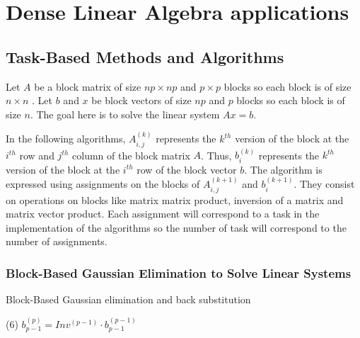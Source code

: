 \chapter{Dense Linear Algebra applications}
\graphicspath{{chapters/exp_dense/}}

\section{Task-Based Methods and Algorithms}


Let $A$ be a block matrix of size $np \times np$ and $p \times p$ blocks so each block is of size $n \times n$ .
Let $b$ and $x$ be block vectors of size $np$ and $p$ blocks so each block is of size $n$.
The goal here is to solve the linear system $Ax=b$.

In the following algorithms, $A_{i,j}^{(k)}$ represents the $k^{th}$ version of the block at the $i^{th}$ row and $j^{th}$ column of the block matrix $A$.
Thus, $b_i^{(k)}$ represents the $k^{th}$ version of the block at the $i^{th}$ row of the block vector $b$.
The algorithm is expressed using assignments on the blocks of $A_{i,j}^{(k+1)}$ and $b_i^{(k+1)}$.
They consist on operations on blocks like matrix matrix product, inversion of a matrix and matrix vector product.
Each assignment will correspond to a task in the implementation of the algorithms so the number of task will correspond to the number of assignments.




\subsection{Block-Based Gaussian Elimination to Solve Linear Systems}

\begin{algorithm}[h]
	\DontPrintSemicolon
	\caption{Block-Based Gaussian elimination and back substitution \label{alg:bg_el_data_dep}}

	(6) $b_{p-1}^{(p)} = Inv^{(p-1)} \cdot b_{p-1}^{(p-1)}$ \;

\end{algorithm}

